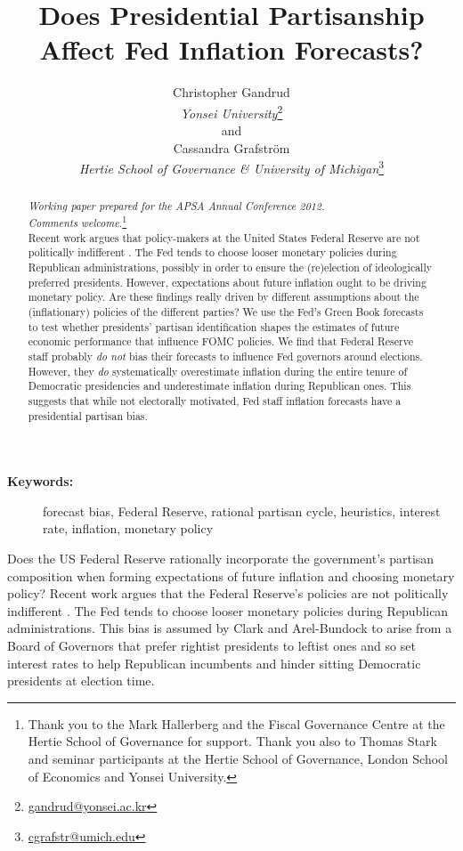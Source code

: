\documentclass[a4paper]{article}
\title{Does Presidential Partisanship Affect Fed Inflation Forecasts?}
\author{Christopher Gandrud \\
                {\emph{Yonsei University}}\footnote{\href{mailto:gandrud@yonsei.ac.kr}{gandrud@yonsei.ac.kr}} \\
                and \\
            Cassandra Grafstr\"{o}m \\
                {\emph{Hertie School of Governance \& University of Michigan}}\footnote{\href{mailto:cgrafstr@umich.edu}{cgrafstr@umich.edu}}}
\begin{document}
\maketitle

\begin{abstract}
\noindent\emph{Working paper prepared for the APSA Annual Conference 2012. \\ Comments welcome.}\footnote{Thank you to the Mark Hallerberg and the Fiscal Governance Centre at the Hertie School of Governance for support. Thank you also to Thomas Stark and seminar participants at the Hertie School of Governance, London School of Economics and Yonsei University.} \\[0.2cm]

Recent work argues that policy-makers at the United States Federal Reserve are not politically indifferent \citep{Clark2012}. The Fed tends to choose looser monetary policies during Republican administrations, possibly in order to ensure the (re)election of ideologically preferred presidents. However, expectations about future inflation ought to be driving monetary policy. Are these findings really driven by different assumptions about the (inflationary) policies of the different parties? We use the Fed's Green Book forecasts to test whether presidents' partisan identification shapes the estimates of future economic performance that influence FOMC policies. We find that Federal Reserve staff probably {\emph{do not}} bias their forecasts to influence Fed governors around elections. However, they {\emph{do}} systematically overestimate inflation during the entire tenure of Democratic presidencies and underestimate inflation during Republican ones. This suggests that while not electorally motivated, Fed staff inflation forecasts have a presidential partisan bias.

\end{abstract}

\begin{description}
  \item [{\textbf{Keywords:}}] forecast bias, Federal Reserve, rational partisan cycle, heuristics, interest rate, inflation, monetary policy
\end{description}

\vspace{0.3cm}

Does the US Federal Reserve rationally incorporate the government's partisan composition when forming expectations of future inflation and choosing monetary policy? Recent work argues that the Federal Reserve's policies are not politically indifferent \citep{Clark2012}. The Fed tends to choose looser monetary policies during Republican administrations. This bias is assumed by Clark and Arel-Bundock to arise from a Board of Governors that prefer rightist presidents to leftist ones and so set interest rates to help Republican incumbents and hinder sitting Democratic presidents at election time. 
\end{document}
